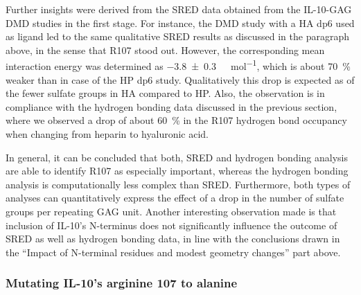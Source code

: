 Further insights were derived from the SRED data obtained from the IL-10-GAG DMD
studies in the first stage. For instance, the DMD study with a HA dp6 used as
ligand led to the same qualitative SRED results as discussed in the paragraph
above, in the sense that R107 stood out. However, the corresponding mean
interaction energy was determined as \SI{-3.8 +-0.3}{\kilo\calory\per\mol},
which is about \SI{70}{\percent} weaker than in case of the HP dp6 study.
Qualitatively this drop is expected as of the fewer sulfate groups in HA
compared to HP. Also, the observation is in compliance with the hydrogen bonding
data discussed in the previous section, where we observed a drop of about
\SI{60}{\percent} in the R107 hydrogen bond occupancy when changing from heparin
to hyaluronic acid.

In general, it can be concluded that both, SRED and hydrogen bonding analysis
are able to identify R107 as especially important, whereas the hydrogen bonding
analysis is computationally less complex than SRED. Furthermore, both types of
analyses can quantitatively express the effect of a drop in the number of
sulfate groups per repeating GAG unit. Another interesting observation made is
that inclusion of IL-10's N-terminus does not significantly influence the
outcome of SRED as well as hydrogen bonding data, in line with the conclusions
drawn in the \enquote{Impact of N-terminal residues and modest geometry changes}
part above.



\subsubsection{Mutating IL-10's arginine 107 to alanine}

